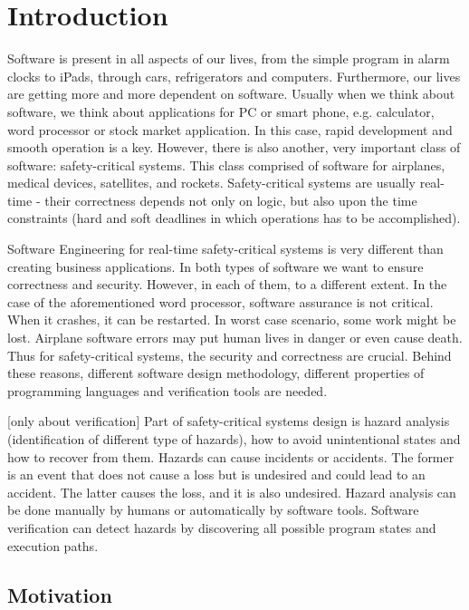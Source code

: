 
\cleardoublepage

\chapter{Introduction}
\label{introduction}

Software is present in all aspects of our lives, from the simple program in alarm clocks to iPads, through cars, refrigerators and computers. Furthermore, our lives are getting more and more dependent on software. Usually when we think about software, we think about applications for PC or smart phone, e.g. calculator, word processor or stock market application. In this case, rapid development and smooth operation is a key. However, there is also another, very important class of software: safety-critical systems. This class comprised of software for airplanes, medical devices, satellites, and rockets. Safety-critical systems are usually real-time - their correctness depends not only on logic, but also upon the time constraints (hard and soft deadlines in which operations has to be accomplished).

Software Engineering for real-time safety-critical systems is very different than creating business applications. In both types of software we want to ensure correctness and security. However, in each of them, to a different extent. In the case of the aforementioned word processor, software assurance is not critical. When it crashes, it can be restarted. In worst case scenario, some work might be lost. Airplane software errors may put human lives in danger or even cause death. Thus for safety-critical systems, the security and correctness are crucial. Behind these reasons, different software design methodology, different properties of programming languages and verification tools are needed.

[only about verification]
Part of safety-critical systems design is hazard analysis (identification of different type of hazards), how to avoid unintentional states and how to recover from them. Hazards can cause incidents or accidents. The former is an event that does not cause a loss but is undesired and could lead to an accident. The latter causes the loss, and it is also undesired. Hazard analysis can be done manually by humans or automatically by software tools. Software verification can detect hazards by discovering all possible program states and execution paths.


\section{Motivation}
\label{introduction:motivation}

